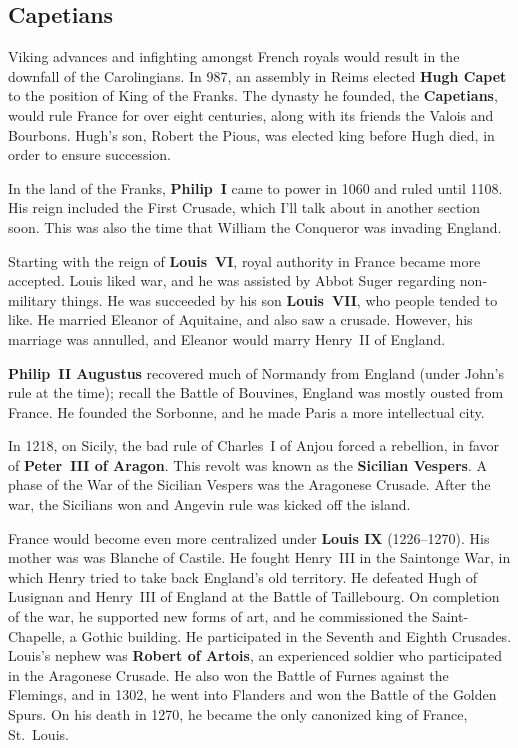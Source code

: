 \subsection*{Capetians}

Viking advances and infighting amongst French royals would result in the downfall of the Carolingians.
In 987, an assembly in Reims elected \textbf{Hugh Capet} to the position of King of the Franks.
The dynasty he founded, the \textbf{Capetians}, would rule France for over eight centuries,
along with its friends the Valois and Bourbons.
Hugh's son, Robert the Pious, was elected king before Hugh died, in order to ensure succession.

In the land of the Franks, \textbf{Philip~I} came to power in 1060 and ruled until 1108.
His reign included the First Crusade, which I'll talk about in another section soon.
This was also the time that William the Conqueror was invading England.

Starting with the reign of \textbf{Louis~VI}, royal authority in France became more accepted.
Louis liked war, and he was assisted by Abbot Suger regarding non-military things.
He was succeeded by his son \textbf{Louis~VII}, who people tended to like.
He married Eleanor of Aquitaine, and also saw a crusade.
However, his marriage was annulled, and Eleanor would marry Henry~II of England.

\textbf{Philip~II Augustus} recovered much of Normandy from England (under John's rule at the time);
recall the Battle of Bouvines, England was mostly ousted from France.
He founded the Sorbonne, and he made Paris a more intellectual city.

In 1218, on Sicily, the bad rule of Charles~I of Anjou forced a rebellion,
in favor of \textbf{Peter~III of Aragon}.
This revolt was known as the \textbf{Sicilian Vespers}.
A phase of the War of the Sicilian Vespers was the Aragonese Crusade.
After the war, the Sicilians won and Angevin rule was kicked off the island.

France would become even more centralized under \textbf{Louis IX} (1226--1270).
His mother was was Blanche of Castile.
He fought Henry~III in the Saintonge War, in which Henry tried to take back England's old territory.
He defeated Hugh of Lusignan and Henry~III of England at the Battle of Taillebourg.
On completion of the war, he supported new forms of art, and he commissioned the Saint-Chapelle, a Gothic building.
He participated in the Seventh and Eighth Crusades.
Louis's nephew was \textbf{Robert of Artois}, an experienced soldier who participated in the Aragonese Crusade.
He also won the Battle of Furnes against the Flemings,
and in 1302, he went into Flanders and won the Battle of the Golden Spurs.
On his death in 1270, he became the only canonized king of France, St.\ Louis.

